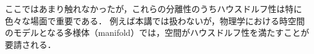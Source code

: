 \documentclass[11pt,a4paper, dvipdfmx]{jsarticle}
\begin{document}
\begin{hatten}{}{}
ここではあまり触れなかったが，これらの分離性のうちハウスドルフ性は特に色々な場面で重要である．
例えば本講では扱わないが，物理学における時空間のモデルとなる多様体（manifold）では，空間がハウスドルフ性を満たすことが要請される．
\end{hatten}









\end{document}
